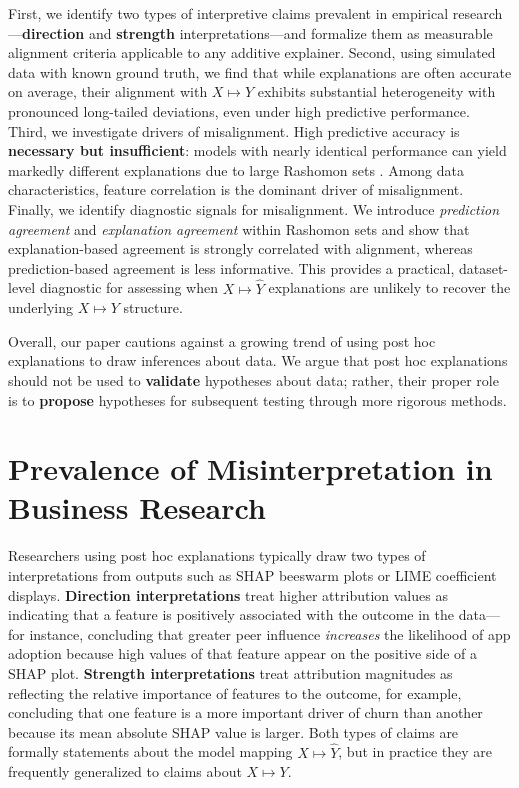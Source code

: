 \documentclass[11pt]{article}
\begin{document}
First, we identify two types of interpretive claims prevalent in empirical research—\textbf{direction} and \textbf{strength} interpretations—and formalize them as measurable alignment criteria applicable to any additive explainer. Second, using simulated data with known ground truth, we find that while explanations are often accurate on average, their alignment with $X \mapsto Y$ exhibits substantial heterogeneity with pronounced long-tailed deviations, even under high predictive performance. Third, we investigate drivers of misalignment. High predictive accuracy is \textbf{necessary but insufficient}: models with nearly identical performance can yield markedly different explanations due to large Rashomon sets \citep{semenova22rashomon,paes23inevitable}. Among data characteristics, feature correlation is the dominant driver of misalignment. Finally, we identify diagnostic signals for misalignment. We introduce \emph{prediction agreement} and \emph{explanation agreement} within Rashomon sets and show that explanation-based agreement is strongly correlated with alignment, whereas prediction-based agreement is less informative. This provides a practical, dataset-level diagnostic for assessing when $X \mapsto \hat{Y}$ explanations are unlikely to recover the underlying $X \mapsto Y$ structure.

Overall, our paper cautions against a growing trend of using post hoc explanations to draw inferences about data. We argue that post hoc explanations should not be used to \textbf{validate} hypotheses about data; rather, their proper role is to \textbf{propose} hypotheses for subsequent testing through more rigorous methods.


   
\section{Prevalence of Misinterpretation in Business Research}

Researchers using post hoc explanations typically draw two types of interpretations from outputs such as SHAP beeswarm plots or LIME coefficient displays. \textbf{Direction interpretations} treat higher attribution values as indicating that a feature is positively associated with the outcome in the data---for instance, concluding that greater peer influence \emph{increases} the likelihood of app adoption because high values of that feature appear on the positive side of a SHAP plot. \textbf{Strength interpretations} treat attribution magnitudes as reflecting the relative importance of features to the outcome, for example, concluding that one feature is a more important driver of churn than another because its mean absolute SHAP value is larger. Both types of claims are formally statements about the model mapping $X \mapsto \hat{Y}$, but in practice they are frequently generalized to claims about $X \mapsto Y$.
\end{document}

